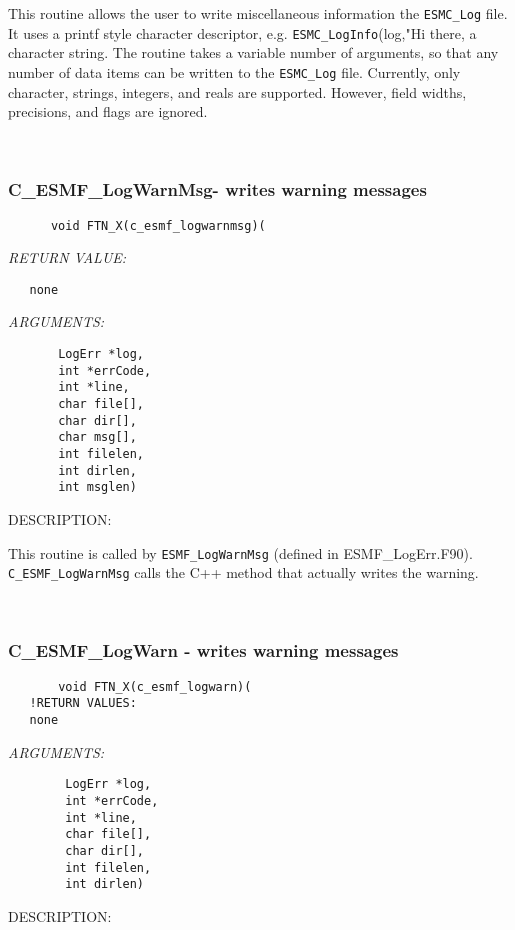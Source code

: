     This routine allows the user to write miscellaneous information the
    {\tt ESMC\_Log} file. It uses a printf style character descriptor, e.g. 
    {\tt ESMC\_LogInfo}(log,"Hi there, %
    a character string. The routine takes a variable number of arguments,
    so that any number of data items can be written to the {\tt ESMC\_Log} file.
    Currently, only character, strings, integers, and reals are supported.
    However, field widths, precisions, and flags are ignored.
   
 
\mbox{}\hrulefill\ 
 
\subsubsection [C\_ESMF\_LogWarnMsg-] {C\_ESMF\_LogWarnMsg- writes warning messages}


  
\begin{verbatim}      void FTN_X(c_esmf_logwarnmsg)(\end{verbatim}{\em RETURN VALUE:}
\begin{verbatim}   none\end{verbatim}{\em ARGUMENTS:}
\begin{verbatim}       LogErr *log,
       int *errCode,
       int *line,
       char file[],
       char dir[],
       char msg[],
       int filelen,
       int dirlen,
       int msglen)\end{verbatim}
{\sf DESCRIPTION:\\ }


      This routine is called by {\tt ESMF\_LogWarnMsg} (defined in ESMF\_LogErr.F90).  
      {\tt C\_ESMF\_LogWarnMsg} calls the C++ method that actually writes the warning.
   
 
\mbox{}\hrulefill\ 
 
\subsubsection [C\_ESMF\_LogWarn] {C\_ESMF\_LogWarn - writes warning messages}


  
\begin{verbatim}       void FTN_X(c_esmf_logwarn)(
   !RETURN VALUES:
   none\end{verbatim}{\em ARGUMENTS:}
\begin{verbatim}        LogErr *log,
        int *errCode,
        int *line,
        char file[],
        char dir[],
        int filelen,
        int dirlen)\end{verbatim}
{\sf DESCRIPTION:\\ }


